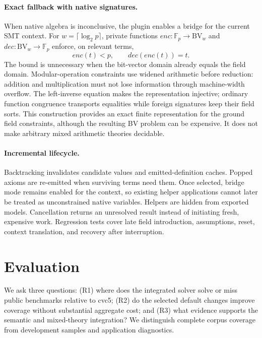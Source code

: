\documentclass[runningheads]{llncs}
\newcommand{\FF}{\mathbb{F}}
\begin{document}
\paragraph{Exact fallback with native signatures.}
When native algebra is inconclusive, the plugin enables a bridge for the current
SMT context. For $w=\lceil\log_2p\rceil$, private functions
$\mathit{enc}:\FF_p\to\mathrm{BV}_w$ and
$\mathit{dec}:\mathrm{BV}_w\to\FF_p$ enforce, on relevant terms,
\[
  \mathit{enc}(t)<p,\qquad
  \mathit{dec}(\mathit{enc}(t))=t.
\]
The bound is unnecessary when the bit-vector domain already equals the field
domain. Modular-operation constraints use widened arithmetic before reduction:
addition and multiplication must not lose information through machine-width
overflow. The left-inverse equation makes the representation injective; ordinary
function congruence transports equalities while foreign signatures keep their
field sorts. This construction provides an exact finite representation for the
ground field constraints, although the resulting BV problem can be expensive.
It does not make arbitrary mixed arithmetic theories decidable.

\paragraph{Incremental lifecycle.}
Backtracking invalidates candidate values and emitted-definition caches. Popped
axioms are re-emitted when surviving terms need them. Once selected, bridge mode
remains enabled for the context, so existing helper applications cannot later
be treated as unconstrained native variables. Helpers are hidden from exported
models. Cancellation returns an unresolved result instead of initiating fresh,
expensive work. Regression tests cover late field introduction, assumptions,
reset, context translation, and recovery after interruption.

\section{Evaluation}
\label{sec:evaluation}

We ask three questions: (R1) where does the integrated solver solve or miss
public benchmarks relative to cvc5; (R2) do the selected default changes improve
coverage without substantial aggregate cost; and (R3) what evidence supports
the semantic and mixed-theory integration? We distinguish complete corpus
coverage from development samples and application diagnostics.
\end{document}
